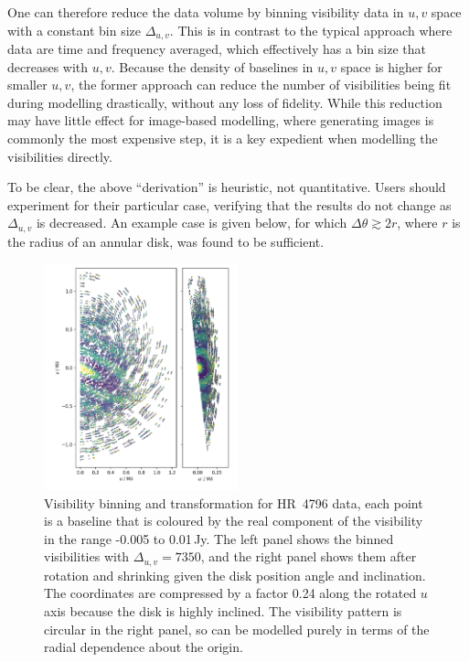 \documentclass[fleqn,usenatbib]{mnras}
\begin{document}
One can therefore reduce the data volume by binning visibility data in $u,v$ space with a constant bin size $\Delta_{u,v}$. This is in contrast to the typical approach where data are time and frequency averaged, which effectively has a bin size that decreases with $u,v$. Because the density of baselines in $u,v$ space is higher for smaller $u,v$, the former approach can reduce the number of visibilities being fit during modelling drastically, without any loss of fidelity. While this reduction may have little effect for image-based modelling, where generating images is commonly the most expensive step, it is a key expedient when modelling the visibilities directly.

To be clear, the above ``derivation'' is heuristic, not quantitative. Users should experiment for their particular case, verifying that the results do not change as $\Delta_{u,v}$ is decreased. An example case is given below, for which $\Delta \theta \gtrsim 2r$, where $r$ is the radius of an annular disk, was found to be sufficient.

\begin{figure}
    \centering
    \hspace{-0.5cm}\includegraphics[width=0.5\textwidth]{vis_avg.png}
    \caption{Visibility binning and transformation for HR~4796 data, each point is a baseline that is coloured by the real component of the visibility in the range -0.005 to 0.01\,Jy. The left panel shows the binned visibilities with $\Delta_{u,v}=7350$, and the right panel shows them after rotation and shrinking given the disk position angle and inclination. The coordinates are compressed by a factor 0.24 along the rotated $u$ axis because the disk is highly inclined. The visibility pattern is circular in the right panel, so can be modelled purely in terms of the radial dependence about the origin.}
    \label{fig:avg}
\end{figure}
\end{document}
